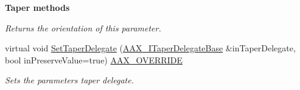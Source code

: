 \begin{Indent}{\bf Taper methods}
\begin{DoxyCompactItemize}
\begin{DoxyCompactList}\small\item\em Returns the orientation of this parameter. \end{DoxyCompactList}\item 
virtual void \hyperlink{a00033_a73951bf97667382f01103a9230ce0c3e}{Set\+Taper\+Delegate} (\hyperlink{a00115}{A\+A\+X\+\_\+\+I\+Taper\+Delegate\+Base} \&in\+Taper\+Delegate, bool in\+Preserve\+Value=true) \hyperlink{a00149_ac2f24a5172689ae684344abdcce55463}{A\+A\+X\+\_\+\+O\+V\+E\+R\+R\+I\+D\+E}
\begin{DoxyCompactList}\small\item\em Sets the parameter\textquotesingle{}s taper delegate. \end{DoxyCompactList}\end{DoxyCompactItemize}
\end{Indent}
